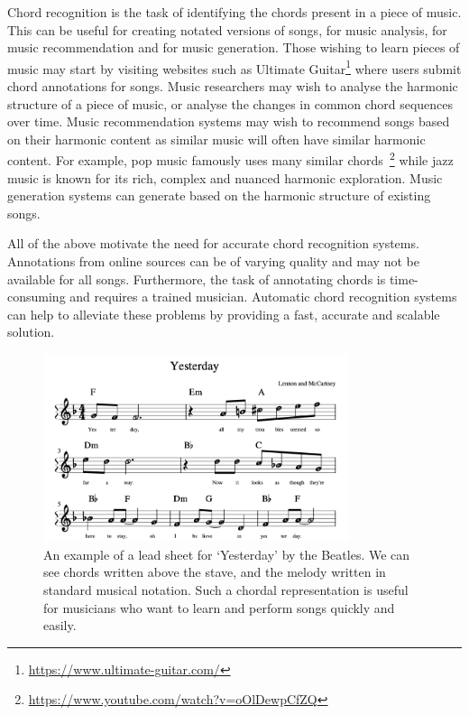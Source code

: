 Chord recognition is the task of identifying the chords present in a piece of music. This can be useful for creating notated versions of songs, for music analysis, for music recommendation and for music generation. Those wishing to learn pieces of music may start by visiting websites such as Ultimate Guitar\footnote{\url{https://www.ultimate-guitar.com/}} where users submit chord annotations for songs. Music researchers may wish to analyse the harmonic structure of a piece of music, or analyse the changes in common chord sequences over time. Music recommendation systems may wish to recommend songs based on their harmonic content as similar music will often have similar harmonic content. For example, pop music famously uses many similar chords~\footnote{\url{https://www.youtube.com/watch?v=oOlDewpCfZQ}} while jazz music is known for its rich, complex and nuanced harmonic exploration. Music generation systems can generate based on the harmonic structure of existing songs.

All of the above motivate the need for accurate chord recognition systems. Annotations from online sources can be of varying quality and may not be available for all songs. Furthermore, the task of annotating chords is time-consuming and requires a trained musician. Automatic chord recognition systems can help to alleviate these problems by providing a fast, accurate and scalable solution.

\begin{figure}[H]
    \centering
    \includegraphics[width=0.8\textwidth]{figures/lead_sheet_example.png}
    \caption{An example of a lead sheet for `Yesterday' by the Beatles. We can see chords written above the stave, and the melody written in standard musical notation. Such a chordal representation is useful for musicians who want to learn and perform songs quickly and easily.}\label{fig:lead_sheet_example}
\end{figure}

